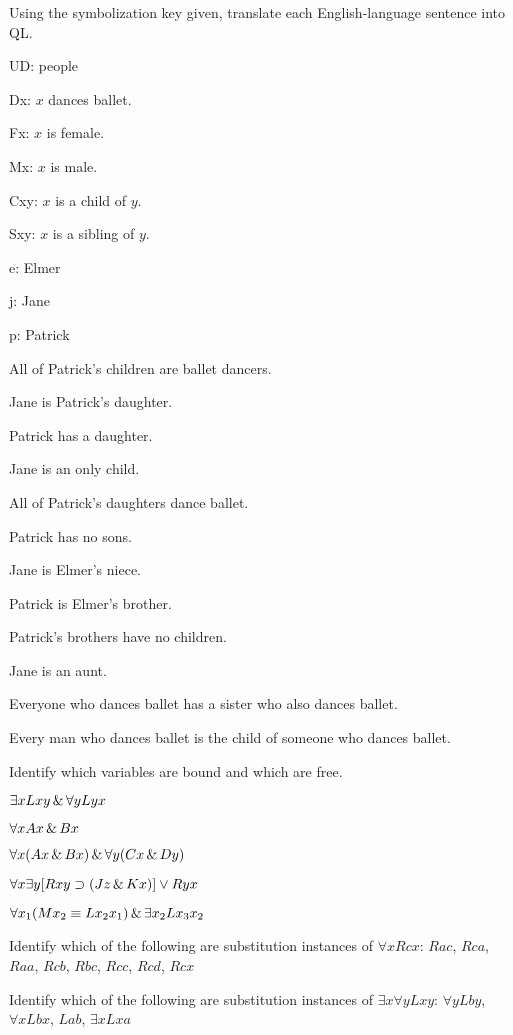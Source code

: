 \solutions
\problempart
\label{pr.QLballet}
Using the symbolization key given, translate each English-language sentence into QL.
\begin{ekey}
\item[UD:] people
\item[Dx:] $x$ dances ballet.
\item[Fx:] $x$ is female.
\item[Mx:] $x$ is male.
\item[Cxy:] $x$ is a child of $y$.
\item[Sxy:] $x$ is a sibling of $y$.
\item[e:] Elmer
\item[j:] Jane
\item[p:] Patrick
\end{ekey}
\begin{earg}
\item All of Patrick's children are ballet dancers.
\item Jane is Patrick's daughter.
\item Patrick has a daughter.
\item Jane is an only child.
\item All of Patrick's daughters dance ballet.
\item Patrick has no sons.
\item Jane is Elmer's niece.
\item Patrick is Elmer's brother.
\item Patrick's brothers have no children.
\item Jane is an aunt.
\item Everyone who dances ballet has a sister who also dances ballet.
\item Every man who dances ballet is the child of someone who dances ballet.
\end{earg}

\problempart
\label{pr.freeQL}
Identify which variables are bound and which are free.
\begin{earg}
\item $\exists x Lxy \,\&\, \forall y Lyx$
\item $\forall x Ax \,\&\, Bx$
\item $\forall x (Ax \,\&\, Bx) \,\&\, \forall y(Cx \,\&\, Dy)$
\item $\forall x\exists y[Rxy \supset (Jz \,\&\, Kx)] \vee Ryx$
\item $\forall x_1(Mx_2 \equiv Lx_2x_1) \,\&\, \exists x_2 Lx_3x_2$
\end{earg}

\solutions
\problempart
\label{pr.subinstanceQL}
\begin{earg}
\item Identify which of the following are substitution instances of $\forall x Rcx$: $Rac$, $Rca$, $Raa$, $Rcb$, $Rbc$, $Rcc$, $Rcd$, $Rcx$
\item Identify which of the following are substitution instances of $\exists x\forall y Lxy$:
$\forall y Lby$, $\forall x Lbx$, $Lab$, $\exists x Lxa$
\end{earg}



